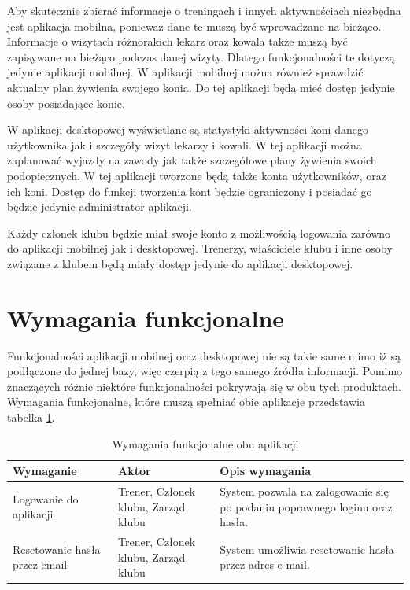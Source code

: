 \documentclass[12pt,oneside]{report}
\begin{document}
Aby skutecznie zbierać informacje o treningach i innych aktywnościach niezbędna jest aplikacja mobilna, ponieważ dane te muszą być wprowadzane na bieżąco. Informacje o wizytach różnorakich lekarz oraz kowala także muszą być zapisywane na bieżąco podczas danej wizyty. Dlatego funkcjonalności te dotyczą jedynie aplikacji mobilnej. W aplikacji mobilnej można również sprawdzić aktualny plan żywienia swojego konia. Do tej aplikacji będą mieć dostęp jedynie osoby posiadające konie. 

W aplikacji desktopowej wyświetlane są statystyki aktywności koni danego użytkownika jak i szczegóły wizyt lekarzy i kowali. W tej aplikacji można zaplanować wyjazdy na zawody jak także szczegółowe plany żywienia swoich podopiecznych. W tej aplikacji tworzone  będą także konta użytkowników, oraz ich koni. Dostęp do funkcji tworzenia kont będzie ograniczony i posiadać go będzie jedynie administrator aplikacji.

Każdy członek klubu będzie miał swoje konto z możliwością logowania zarówno do aplikacji mobilnej jak i desktopowej. Trenerzy, właściciele klubu i inne osoby związane z klubem będą miały dostęp jedynie do aplikacji desktopowej. 


\section{Wymagania funkcjonalne}
Funkcjonalności aplikacji mobilnej oraz desktopowej nie są takie same mimo iż są podłączone do jednej bazy, więc czerpią z tego samego źródła informacji. Pomimo znaczących różnic niektóre funkcjonalności pokrywają się w obu tych produktach. 
Wymagania funkcjonalne, które muszą spełniać obie aplikacje przedstawia tabelka \ref{funkcjonalneObuApek}.
\begin{table}[H]
	\centering
\begin{tabular}{|p{4.5cm}|p{4cm}|p{7cm}|}			
	\hline
	Wymaganie & Aktor & Opis wymagania\\
	\hline
	Logowanie do aplikacji& Trener, Członek klubu, Zarząd klubu & System pozwala na zalogowanie się po podaniu poprawnego loginu oraz hasła.\\
	\hline
	Resetowanie hasła przez email & Trener, Członek klubu, Zarząd klubu& System umożliwia resetowanie hasła przez adres e-mail. \\
	\hline
	
\end{tabular}
	\caption{Wymagania funkcjonalne obu aplikacji}
	\label{funkcjonalneObuApek}
\end{table}
\end{document}
